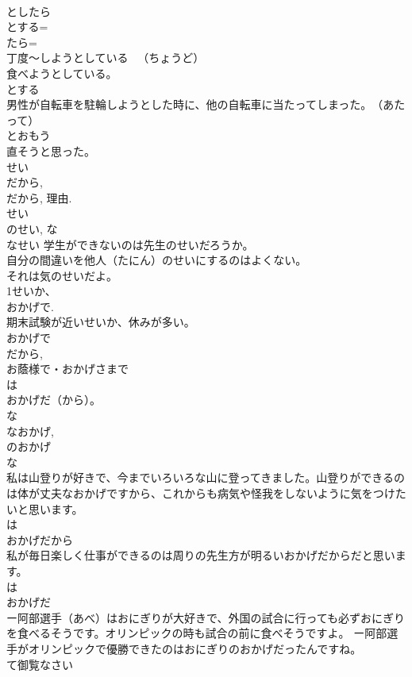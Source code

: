 \documentclass[8pt]{extreport}
\begin{document}
\begin{CJK}{UTF8}{min}
\\	としたら	
\\	とする=
\\	たら=
\\	丁度～しようとしている 　（ちょうど） 
\\	食べようとしている。 
\\	とする 
\\	男性が自転車を駐輪しようとした時に、他の自転車に当たってしまった。　（あたって）　　 
\\	とおもう 
\\	直そうと思った。　
\\	せい	
\\	だから, 
\\	だから, 理由. 
\\	せい
\\	のせい, な
\\	なせい 学生ができないのは先生のせいだろうか。 
\\	自分の間違いを他人（たにん）のせいにするのはよくない。 
\\	それは気のせいだよ。 
\\	1せいか、
\\	おかげで. 
\\	期末試験が近いせいか、休みが多い。 
\\	おかげで 
\\	だから, 
\\	お蔭様で・おかげさまで 
\\	は
\\	おかげだ（から）。 
\\	な
\\	なおかげ, 
\\	のおかげ 
\\	な
\\	私は山登りが好きで、今までいろいろな山に登ってきました。山登りができるのは体が丈夫なおかげですから、これからも病気や怪我をしないように気をつけたいと思います。 
\\	は
\\	おかげだから 
\\	私が毎日楽しく仕事ができるのは周りの先生方が明るいおかげだからだと思います。 
\\	は
\\	おかげだ 
\\	ー阿部選手（あべ）はおにぎりが大好きで、外国の試合に行っても必ずおにぎりを食べるそうです。オリンピックの時も試合の前に食べそうですよ。 ー阿部選手がオリンピックで優勝できたのはおにぎりのおかげだったんですね。 
\\	て御覧なさい	

\end{CJK}
\end{document}
